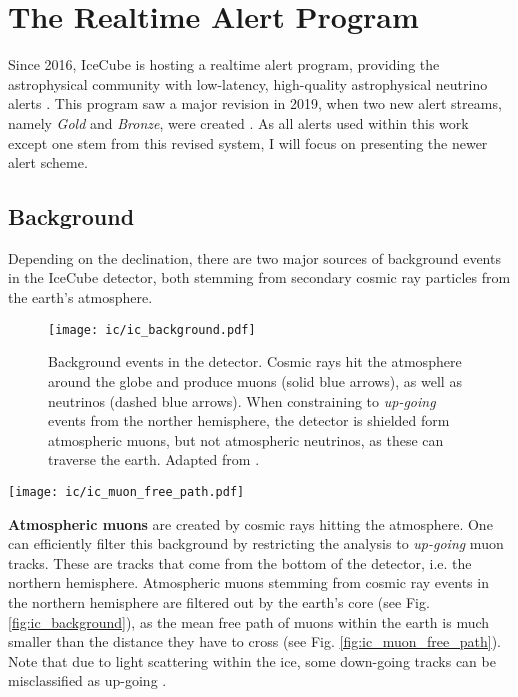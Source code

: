 \section{The Realtime Alert Program}\label{ic_alert_program}
Since 2016, IceCube is hosting a realtime alert program, providing the astrophysical community with low-latency, high-quality astrophysical neutrino alerts \cite{Aartsen2017a}. This program saw a major revision in 2019, when two new alert streams, namely \textit{Gold} and \textit{Bronze}, were created . As all alerts used within this work except one stem from this revised system, I will focus on presenting the newer alert scheme.

\subsection{Background}\label{background}
Depending on the declination, there are two major sources of background events in the IceCube detector, both stemming from secondary cosmic ray particles from the earth's atmosphere.
\begin{figure}[htb]
    \texttt{[image: ic/ic\_background.pdf]}
    \caption[Background events]{Background events in the detector. Cosmic rays hit the atmosphere around the globe and produce muons (solid blue arrows), as well as neutrinos (dashed blue arrows). When constraining to \textit{up-going} events from the norther hemisphere, the detector is shielded form atmospheric muons, but not atmospheric neutrinos, as these can traverse the earth. Adapted from \cite{Ahlers2018a}.}
\end{figure}

\begin{marginfigure}
    \texttt{[image: ic/ic\_muon\_free\_path.pdf]}
    \caption[Muon free path in ice]{Free path length for \SI{1}{\peta\eV} muons in ice. The mean free path in ice is slightly longer than in rock. From \cite{Chirkin2004}.}
\end{marginfigure}

\textbf{Atmospheric muons} are created by cosmic rays hitting the atmosphere. One can efficiently filter this background by restricting the analysis to \textit{up-going} muon tracks. These are tracks that come from the bottom of the detector, i.e. the northern hemisphere. Atmospheric muons stemming from cosmic ray events in the northern hemisphere are filtered out by the earth's core (see Fig. \ref{fig:ic_background}), as the mean free path of muons within the earth is much smaller  than the distance they have to cross (see Fig. \ref{fig:ic_muon_free_path}). Note that due to light scattering within the ice, some down-going tracks can be misclassified as up-going .

